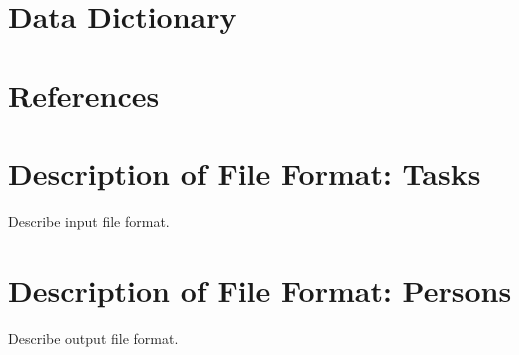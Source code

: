\documentclass[12pt]{article}
\begin{document}
\section{Data Dictionary}

\section{References}

\appendix

\section{Description of File Format: Tasks}

Describe input file format.

\section{Description of File Format: Persons}

Describe output file format.
\end{document}
